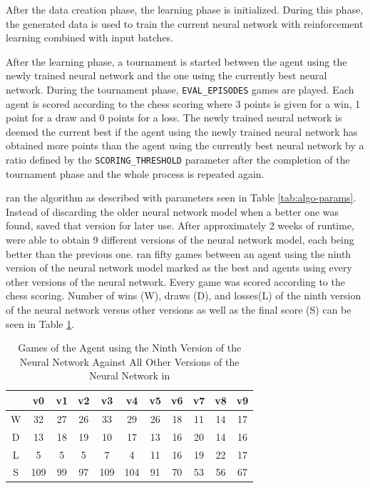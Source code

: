 After the data creation phase, the learning phase is initialized. During this phase, the generated data is used to train the current neural network with reinforcement learning combined with input batches.

After the learning phase, a tournament is started between the agent using the newly trained neural network and the one using the currently best neural network. During the tournament phase, \verb!EVAL_EPISODES! games are played. Each agent is scored according to the chess scoring where 3 points is given for a win, 1 point for a draw and 0 points for a loss. The newly trained neural network is deemed the current best if the agent using the newly trained neural network has obtained more points than the agent using the currently best neural network by a ratio defined by the \verb!SCORING_THRESHOLD! parameter after the completion of the tournament phase and the whole process is repeated again.

\cite{Popic_Boskovic_Brest_2021} ran the algorithm as described with parameters seen in Table \ref{tab:algo-params}. Instead of discarding the older neural network model when a better one was found, \cite{Popic_Boskovic_Brest_2021} saved that version for later use. After approximately 2 weeks of runtime, \cite{Popic_Boskovic_Brest_2021} were able to obtain 9 different versions of the neural network model, each being better than the previous one. \cite{Popic_Boskovic_Brest_2021} ran fifty games between an agent using the ninth version of the neural network model marked as the best and agents using every other versions of the neural network. Every game was scored according to the chess scoring. Number of wins (W), draws (D), and losses(L) of the ninth version of the neural network versus other versions as well as the final score (S) can be seen in Table \ref{tab:v9_summary}.

\begin{table}[htb]
    \centering
    \begin{tabular}{c|cccccccccc}
        & v0 & v1 & v2 & v3 & v4 & v5 & v6 & v7 & v8 & v9 \\ \hline
        W & 32 & 27 & 26 & 33 & 29 & 26 & 18 & 11 & 14 & 17 \\
        D & 13 & 18 & 19 & 10 & 17 & 13 & 16 & 20 & 14 & 16 \\
        L & 5 & 5 & 5 & 7 & 4 & 11 & 16 & 19 & 22 & 17 \\ \hline
        S & 109 & 99 & 97 & 109 & 104 & 91 & 70 & 53 & 56 & 67
    \end{tabular}
    \caption{Games of the Agent using the Ninth Version of the Neural Network Against All Other Versions of the Neural Network in \cite{Popic_Boskovic_Brest_2021}}
    \label{tab:v9_summary}
\end{table}

